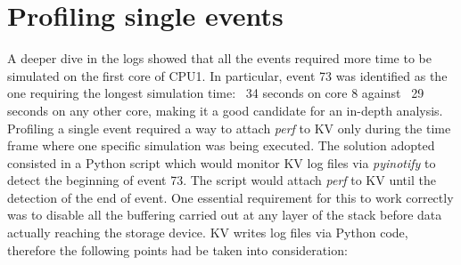 \documentclass[a4paper]{jpconf}
\begin{document}
\section{Profiling single events}
A deeper dive in the logs showed that all the events required more time to be 
simulated on the first core of CPU1. In particular, event 73 was identified as the one
requiring the longest simulation time: ~34 seconds on core 8 against ~29 seconds
on any other core, making it a good candidate for an in-depth analysis. Profiling 
a single event required a way to attach \textit{perf} to KV only during the time frame
where one specific simulation was being executed. The solution adopted consisted
in a Python script which would monitor KV log files via \textit{pyinotify} to detect
the beginning of event 73. The script would attach \textit{perf} to KV until the
detection of the end of event. One essential requirement for this to work correctly
was to disable all the buffering carried out at any layer of the stack before
data actually reaching the storage device. KV writes log files via Python code,
therefore the following points had be taken into consideration:

\end{document}
